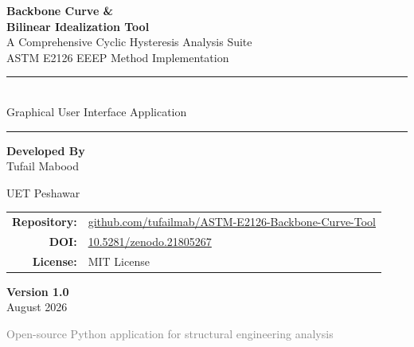\documentclass[11pt,a4paper]{article}
\begin{document}

\begin{titlepage}
\centering

\vspace*{2cm}

{\Huge \textbf{Backbone Curve \&}}\\[0.3cm]
{\Huge \textbf{Bilinear Idealization Tool}}\\[0.5cm]

{\Large \textcolor{blue!60!black}{A Comprehensive Cyclic Hysteresis Analysis Suite}}\\[0.3cm]
{\large \textcolor{blue!40!black}{ASTM E2126 EEEP Method Implementation}}

\vspace{1.5cm}

\rule{8cm}{1pt}\\[0.3cm]
{\large \textcolor{blue!40!black}{Graphical User Interface Application}}\\
\rule{8cm}{1pt}

\vspace{2cm}

{\large \textbf{Developed By}}\\[0.5cm]
{\Huge \textcolor{blue!60!black}{Tufail Mabood}}

\vspace{0.5cm}
{\large UET Peshawar}

\vspace{1.5cm}

\begin{minipage}{0.7\textwidth}
\centering
\vspace{0.3cm}
\begin{tabular}{r l}
\textbf{Repository:} & \href{https://github.com/tufailmab/ASTM-E2126-Backbone-Curve-Tool}{github.com/tufailmab/ASTM-E2126-Backbone-Curve-Tool} \\[0.3em]
\textbf{DOI:} & \href{https://zenodo.org/records/21805267}{10.5281/zenodo.21805267} \\[0.3em]
\textbf{License:} & MIT License \\
\end{tabular}
\vspace{0.3cm}
\end{minipage}

\vfill

{\large \textbf{Version 1.0}}\\[0.2cm]
{\large August 2026}

\vspace{1cm}

{\small \textcolor{gray}{Open-source Python application for structural engineering analysis}}

\end{titlepage}
\end{document}
